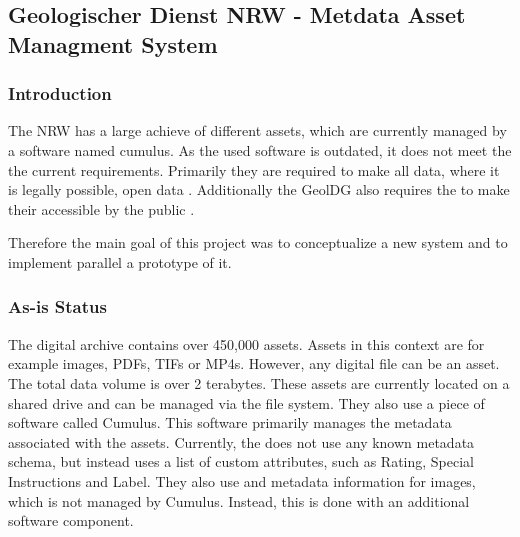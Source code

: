 \documentclass[11pt, titlepage, a4paper]{article}
\begin{document}
\subsection{Geologischer Dienst NRW - Metdata Asset Managment System}
\subsubsection{Introduction}
The   NRW has a large achieve of different assets, which are currently managed by a software named cumulus. As the used software is outdated, it does not meet the the current requirements.
Primarily they  are required to make all data, where it is legally possible, open data \cite{GesetzZurForderung2017}.
Additionally the GeolDG also requires the  to make their accessible by the public \cite{GesetzZurStaatlichen2020}.

Therefore the main goal of this project was to conceptualize a new system and to implement parallel a prototype of it.
\subsubsection{As-is Status}
The  digital archive contains over 450,000 assets. Assets in this context are for example images, PDFs, TIFs or MP4s. However, any digital file can be an asset. The total data volume is over 2 terabytes.
These assets are currently located on a shared drive and can be managed via the file system. They also use a piece of software called Cumulus. This software primarily manages the metadata associated with the assets. Currently, the  does not use any known metadata schema, but instead uses a list of custom attributes, such as Rating, Special Instructions and Label.
They also use  and  metadata information for images, which is not managed by Cumulus. Instead, this is done with an additional software component. %
\end{document}

